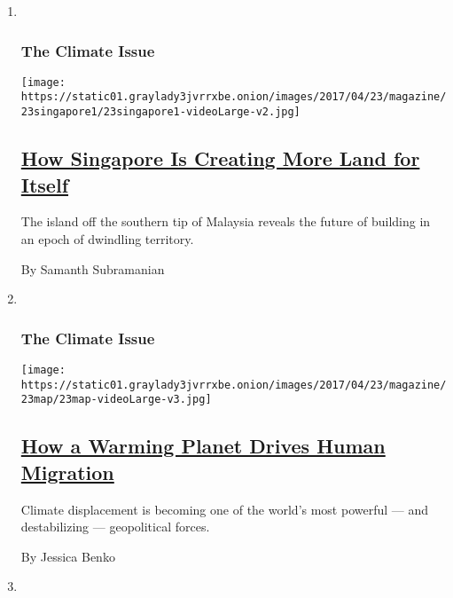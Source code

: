 \begin{enumerate}
\def\labelenumi{\arabic{enumi}.}
\item ~
  \hypertarget{the-climate-issue-4}{%
  \subsubsection{The Climate Issue}\label{the-climate-issue-4}}

  \texttt{[image: https://static01.graylady3jvrrxbe.onion/images/2017/04/23/magazine/23singapore1/23singapore1-videoLarge-v2.jpg]}

  \hypertarget{how-singapore-is-creating-more-land-for-itself}{%
  \subsection{\texorpdfstring{\href{/2017/04/20/magazine/how-singapore-is-creating-more-land-for-itself.html}{How
  Singapore Is Creating More Land for
  Itself}}{How Singapore Is Creating More Land for Itself}}\label{how-singapore-is-creating-more-land-for-itself}}

  The island off the southern tip of Malaysia reveals the future of
  building in an epoch of dwindling territory.

  By Samanth Subramanian
\item ~
  \hypertarget{the-climate-issue-5}{%
  \subsubsection{The Climate Issue}\label{the-climate-issue-5}}

  \texttt{[image: https://static01.graylady3jvrrxbe.onion/images/2017/04/23/magazine/23map/23map-videoLarge-v3.jpg]}

  \hypertarget{how-a-warming-planet-drives-human-migration}{%
  \subsection{\texorpdfstring{\href{/2017/04/19/magazine/how-a-warming-planet-drives-human-migration.html}{How
  a Warming Planet Drives Human
  Migration}}{How a Warming Planet Drives Human Migration}}\label{how-a-warming-planet-drives-human-migration}}

  Climate displacement is becoming one of the world's most powerful ---
  and destabilizing --- geopolitical forces.

  By Jessica Benko
\item ~
  \hypertarget{first-words}{%
}
\end{enumerate}
